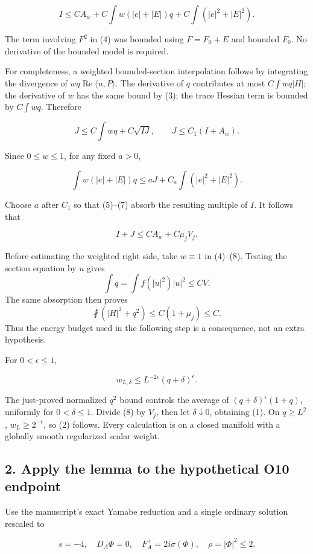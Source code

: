 \documentclass[11pt]{article}
\begin{document}
\[
 I\le C A_w+C\int w(|e|+|E|)q+C\int (|e|^2+|E|^2).
\tag{A.5}
\]

The term involving \(F^2\) in (4) was bounded using \(F=F_0+E\) and
bounded \(F_0\). No derivative of the bounded model is required.

For completeness, a weighted bounded-section interpolation follows by
integrating the divergence of \(wq\operatorname{Re}\langle u,P\rangle\).
The derivative of \(q\) contributes at most \(C\int wq|H|\); the
derivative of \(w\) has the same bound by (3); the trace Hessian term is
bounded by \(C\int wq\). Therefore

\[
 J\le C\int wq+C\sqrt{IJ},\qquad
 J\le C_1(I+A_w).\tag{A.6}
\]

Since \(0\le w\le1\), for any fixed \(a>0\),

\[
 \int w(|e|+|E|)q
 \le aJ+C_a\int(|e|^2+|E|^2).
\tag{A.7}
\]

Choose \(a\) after \(C_1\) so that (5)--(7) absorb the resulting
multiple of \(I\). It follows that

\[
 I+J\le C A_w+C\mu_jV_j.
\tag{A.8}
\]

Before estimating the weighted right side, take \(w\equiv1\) in
(4)--(8). Testing the section equation by \(u\) gives \[
\int q=\int f(|u|^2)|u|^2\le CV.
\] The same absorption then proves \[
\fint(|H|^2+q^2)\le C(1+\mu_j)\le C.
\] Thus the energy budget used in the following step is a consequence,
not an extra hypothesis.

For \(0<\epsilon\le1\),

\[
 w_{L,\delta}\le L^{-2\epsilon}(q+\delta)^\epsilon.
\]

The just-proved normalized \(q^2\) bound controls the average of
\((q+\delta)^\epsilon(1+q)\), uniformly for \(0<\delta\le1\). Divide (8)
by \(V_j\), then let \(\delta\downarrow0\), obtaining (1). On
\(q\ge L^2\), \(w_L\ge2^{-\epsilon}\), so (2) follows. Every calculation
is on a closed manifold with a globally smooth regularized scalar
weight.

\hypertarget{apply-the-lemma-to-the-hypothetical-o10-endpoint}{%
\subsection{2. Apply the lemma to the hypothetical O10
endpoint}\label{apply-the-lemma-to-the-hypothetical-o10-endpoint}}

Use the manuscript's exact Yamabe reduction and a single ordinary
solution rescaled to

\[
 s=-4,\quad D_A\Phi=0,\quad F_A^+=2i\sigma(\Phi),
 \quad \rho=|\Phi|^2\le2.
\]
\end{document}
